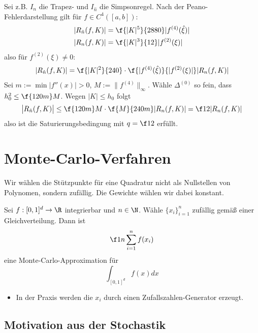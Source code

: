 \documentclass[11pt]{scrbook}
\begin{document}
\begin{st}
\begin{note}
\begin{itemize}
				Sei z.B. $I_n$ die Trapez- und $I_{\hat n}$  die Simpsonregel.
				Nach der Peano-Fehlerdarstellung gilt für $f\in C^4([a,b])$:
				\begin{align*}
					|R_{\hat n}(f, K)| &= \f {|K|^5}{2880} |f^{(4)}(\hat \xi)| \\
					|R_{n}(f, K)| &= \f {|K|^3}{12} |f^{(2)}(\xi)|
				\end{align*}
				also für $f^{(2)}(\xi) \neq 0$:
				\begin{align*}
					|R_{\hat n}(f,K)| = \f {|K|^2}{240} \cdot \f {|f^{(4)}(\hat \xi)}{|f^{(2)}(\xi)|} |R_n(f,K)|
				\end{align*}
				Sei $m := \min |f''(x)| > 0$, $M := \|f^{(4)}\|_\infty$.
				Wähle $\Delta^{(0)}$ so fein, dass $h_0^2 \le \f {120 m}M$.
				Wegen $|K| \le h_0$ folgt
				\[
					\big| R_{\hat n}(f, K) \big| 
					\le \f {120m}M \cdot \f{M}{240m} |R_n(f,K)|
					= \f 12 |R_n(f,K)|
				\]
				also ist die Saturierungsbedingung mit $q=\f 12$ erfüllt.
		\end{itemize}
	\end{note}
\end{st}

\section{Monte-Carlo-Verfahren}

Wir wählen die Stützpunkte für eine Quadratur nicht als Nullstellen von Polynomen, sondern zufällig.
Die Gewichte wählen wir dabei konstant.

\begin{df}
	\label{2.38}	
	Sei $f:[0,1]^d \to \R$ integrierbar und $n\in \N$.
	Wähle $\{x_i\}_{i=1}^n$ zufällig gemäß einer Gleichverteilung.
	Dann ist
	\[
		\f 1n \sum_{i=1}^n f(x_i)
	\]
	eine Monte-Carlo-Approximation für
	\[
		\int_{[0,1]^d} f(x) dx
	\]
\end{df}

\begin{nt*}
	\begin{itemize}
		\item
			In der Praxis werden die $x_i$ durch einen Zufallszahlen-Generator erzeugt.
	\end{itemize}
\end{nt*}

\subsection{Motivation aus der Stochastik}
\end{document}

